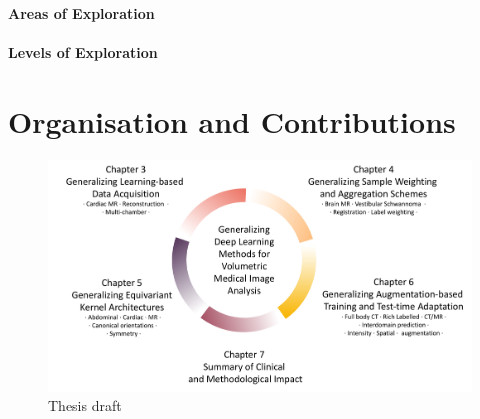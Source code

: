         \paragraph{Areas of Exploration}

        \paragraph{Levels of Exploration}


        \section{Organisation and Contributions}  %
        \begin{figure}
            \label{fig:draft}
            \includegraphics[width=\textwidth]{sections/01_introduction/figures/draft.pdf}
            \caption{Thesis draft}
        \end{figure}

        \noindent{}

    \noindent{}

    \noindent{}
    \noindent{}